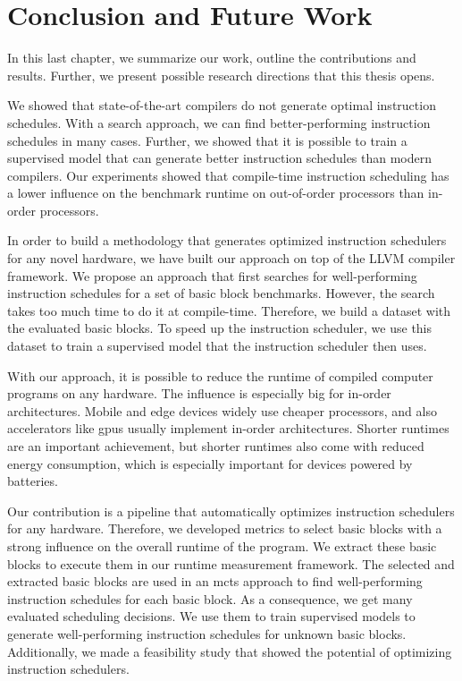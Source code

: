 \chapter{Conclusion and Future Work}
\label{sec:conclusion}
In this last chapter, we summarize our work, outline the contributions and results.
Further, we present possible research directions that this thesis opens.

We showed that state-of-the-art compilers do not generate optimal instruction schedules.
With a search approach, we can find better-performing instruction schedules in many cases.
Further, we showed that it is possible to train a supervised model that can generate better instruction schedules than modern compilers.
Our experiments showed that compile-time instruction scheduling has a lower influence on the benchmark runtime on out-of-order processors than in-order processors.

In order to build a methodology that generates optimized instruction schedulers for any novel hardware, we have built our approach on top of the LLVM compiler framework.
We propose an approach that first searches for well-performing instruction schedules for a set of basic block benchmarks.
However, the search takes too much time to do it at compile-time.
Therefore, we build a dataset with the evaluated basic blocks.
To speed up the instruction scheduler, we use this dataset to train a supervised model that the instruction scheduler then uses.

With our approach, it is possible to reduce the runtime of compiled computer programs on any hardware.
The influence is especially big for in-order architectures.
Mobile and edge devices widely use cheaper processors, and also accelerators like \acp{gpu} usually implement in-order architectures.
Shorter runtimes are an important achievement, but shorter runtimes also come with reduced energy consumption, which is especially important for devices powered by batteries.

Our contribution is a pipeline that automatically optimizes instruction schedulers for any hardware.
Therefore, we developed metrics to select basic blocks with a strong influence on the overall runtime of the program.
We extract these basic blocks to execute them in our runtime measurement framework.
The selected and extracted basic blocks are used in an \ac{mcts} approach to find well-performing instruction schedules for each basic block.
As a consequence, we get many evaluated scheduling decisions.
We use them to train supervised models to generate well-performing instruction schedules for unknown basic blocks.
Additionally, we made a feasibility study that showed the potential of optimizing instruction schedulers.

